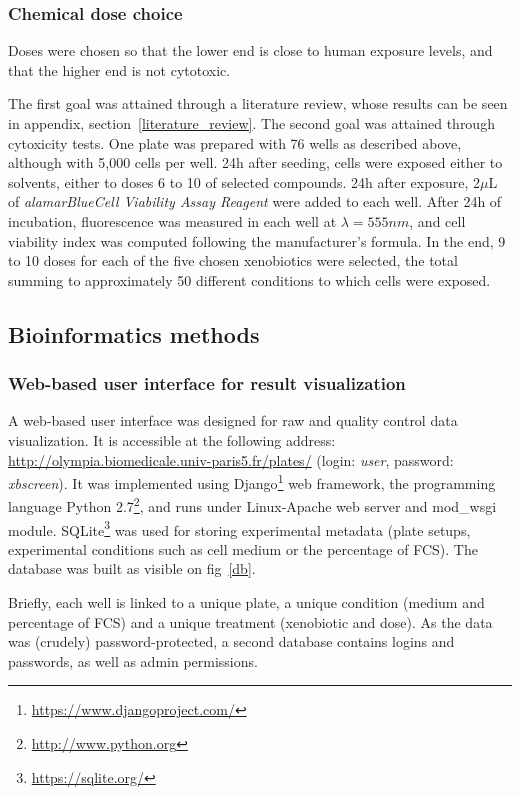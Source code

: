 \subsubsection{Chemical dose choice}
Doses were chosen so that the lower end is close to human exposure levels, and that the higher end is not cytotoxic.

The first goal was attained through a literature review, whose results can be seen in appendix, section~\ref{literature_review}. The second goal was attained through cytoxicity tests. One plate was prepared with 76 wells as described above, although with 5,000 cells per well. 24h after seeding, cells were exposed either to solvents, either to doses 6 to 10 of selected compounds. 24h after exposure, 2$\mu$L of \textit{alamarBlue\texttrademark Cell Viability Assay Reagent} were added to each well. After 24h of incubation, fluorescence was measured in each well at $\lambda = 555nm$, and cell viability index was computed following the manufacturer's formula. In the end, 9 to 10 doses for each of the five chosen xenobiotics were selected, the total summing to approximately 50 different conditions to which cells were exposed.

\subsection{Bioinformatics methods}
\label{interface}
\subsubsection{Web-based user interface for result visualization}  A web-based user interface was designed for raw  and quality control data visualization. It is accessible at the following address: \href{http://olympia.biomedicale.univ-paris5.fr/plates/}{http://olympia.biomedicale.univ-paris5.fr/plates/} (login: \textit{user}, password: \textit{xbscreen}). It was implemented using Django\footnote{\href{https://www.djangoproject.com/}{https://www.djangoproject.com/}} web framework, the programming language Python 2.7\footnote{\href{http://www.python.org}{http://www.python.org}}, and runs under Linux-Apache web server and mod\_wsgi module. SQLite\footnote{\href{https://sqlite.org/}{https://sqlite.org/}} was used for storing experimental metadata (plate setups, experimental conditions such as cell medium or the percentage of FCS). The database was built as visible on fig~\ref{db}.

Briefly, each well is linked to a unique plate, a unique condition (medium and percentage of FCS) and a unique treatment (xenobiotic and dose). As the data was (crudely) password-protected, a second database contains logins and passwords, as well as admin permissions.

